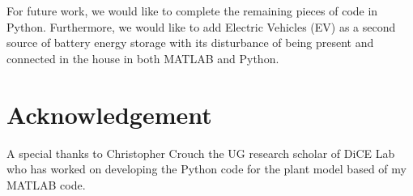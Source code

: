 \documentclass[11pt,usenames]{article}
\begin{document}
For future work, we would like to complete the remaining pieces of code in Python. Furthermore, we would like to add Electric Vehicles (EV) as a second source of battery energy storage with its disturbance of being present and connected in the house in both MATLAB and Python.

\newpage

\section{Acknowledgement}\label{section:Acknowledgement}
A special thanks to Christopher Crouch the UG research scholar of DiCE Lab who has worked on developing the Python code for the plant model based of my MATLAB code.



	
\end{document}
